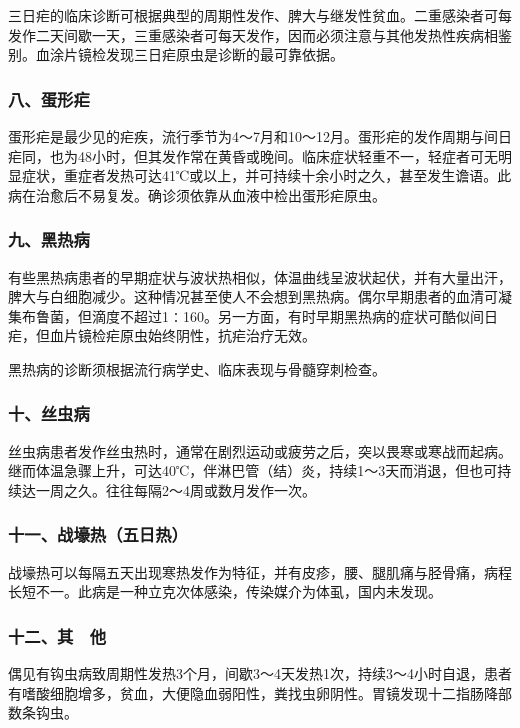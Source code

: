 三日疟的临床诊断可根据典型的周期性发作、脾大与继发性贫血。二重感染者可每发作二天间歇一天，三重感染者可每天发作，因而必须注意与其他发热性疾病相鉴别。血涂片镜检发现三日疟原虫是诊断的最可靠依据。

\subsubsection{八、蛋形疟}

蛋形疟是最少见的疟疾，流行季节为4～7月和10～12月。蛋形疟的发作周期与间日疟同，也为48小时，但其发作常在黄昏或晚间。临床症状轻重不一，轻症者可无明显症状，重症者发热可达41℃或以上，并可持续十余小时之久，甚至发生谵语。此病在治愈后不易复发。确诊须依靠从血液中检出蛋形疟原虫。

\subsubsection{九、黑热病}

有些黑热病患者的早期症状与波状热相似，体温曲线呈波状起伏，并有大量出汗，脾大与白细胞减少。这种情况甚至使人不会想到黑热病。偶尔早期患者的血清可凝集布鲁菌，但滴度不超过1∶160。另一方面，有时早期黑热病的症状可酷似间日疟，但血片镜检疟原虫始终阴性，抗疟治疗无效。

黑热病的诊断须根据流行病学史、临床表现与骨髓穿刺检查。

\subsubsection{十、丝虫病}

丝虫病患者发作丝虫热时，通常在剧烈运动或疲劳之后，突以畏寒或寒战而起病。继而体温急骤上升，可达40℃，伴淋巴管（结）炎，持续1～3天而消退，但也可持续达一周之久。往往每隔2～4周或数月发作一次。

\subsubsection{十一、战壕热（五日热）}

战壕热可以每隔五天出现寒热发作为特征，并有皮疹，腰、腿肌痛与胫骨痛，病程长短不一。此病是一种立克次体感染，传染媒介为体虱，国内未发现。

\subsubsection{十二、其　他}

偶见有钩虫病致周期性发热3个月，间歇3～4天发热1次，持续3～4小时自退，患者有嗜酸细胞增多，贫血，大便隐血弱阳性，粪找虫卵阴性。胃镜发现十二指肠降部数条钩虫。

